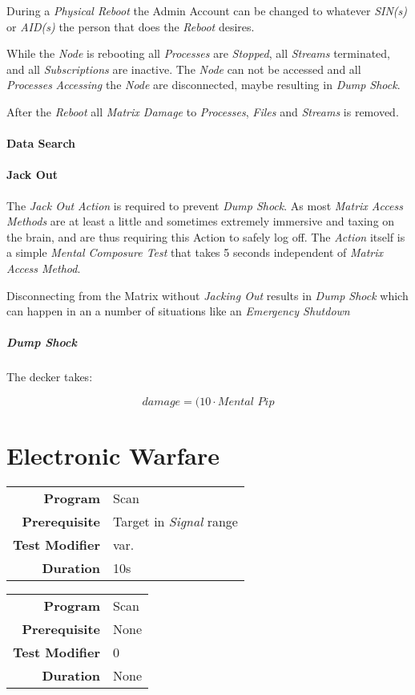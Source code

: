 During a \emph{Physical Reboot} the Admin Account can be changed to whatever
\emph{SIN(s)} or \emph{AID(s)} the person that does the \emph{Reboot} desires.

While the \emph{Node} is rebooting all \emph{Processes} are \emph{Stopped}, all
\emph{Streams} terminated, and all \emph{Subscriptions} are inactive. The
\emph{Node} can not be accessed and all \emph{Processes} \emph{Accessing} the
\emph{Node} are disconnected, maybe resulting in \emph{Dump Shock}.


After the \emph{Reboot} all \emph{Matrix Damage} to \emph{Processes}, \emph{Files}
and \emph{Streams} is removed.

\paragraph{Data Search}

\paragraph{Jack Out}

The \emph{Jack Out Action} is required to prevent \emph{Dump Shock}. As most
\emph{Matrix Access Methods} are at least a little and sometimes extremely
immersive and taxing on the brain, and are thus requiring this Action to safely
log off. The \emph{Action} itself is a simple \emph{Mental Composure Test} that
takes 5 seconds independent of \emph{Matrix Access Method}.

Disconnecting from the Matrix without \emph{Jacking Out} results in
\emph{Dump Shock} which can happen in an a number of situations like an
\emph{Emergency Shutdown}


\subparagraph{Dump Shock}

The decker takes:

\begin{equation}
    \textit{damage} = (10 \cdot \textit{Mental Pip}
\end{equation}

\section{Electronic Warfare}

\label{par:find wireless}


\begin{tabular}{rl}
    \textbf{Program}       & Scan                          \\
    \textbf{Prerequisite}  & Target in \emph{Signal} range \\
    \textbf{Test Modifier} & var.                          \\
    \textbf{Duration}      & 10s                           \\
\end{tabular}

\hfill

\label{par:jam wireless}


\begin{tabular}{rl}
    \textbf{Program}       & Scan \\
    \textbf{Prerequisite}  & None \\
    \textbf{Test Modifier} & 0    \\
    \textbf{Duration}      & None \\
\end{tabular}

\hfill
